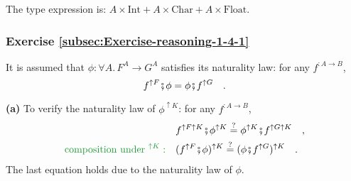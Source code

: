 The type expression is: $A\times\text{Int}+A\times\text{Char}+A\times\text{Float}$.


\subsubsection*{Exercise \ref{subsec:Exercise-reasoning-1-4-1}}

It is assumed that $\phi:\forall A.\,F^{A}\rightarrow G^{A}$ satisfies
its naturality law: for any $f^{:A\rightarrow B}$,
\[
f^{\uparrow F}\bef\phi=\phi\bef f^{\uparrow G}\quad.
\]

\textbf{(a)} To verify the naturality law of $\phi^{\uparrow K}$:
for any $f^{:A\rightarrow B}$,
\begin{align*}
 & f^{\uparrow F\uparrow K}\bef\phi^{\uparrow K}\overset{?}{=}\phi^{\uparrow K}\bef f^{\uparrow G\uparrow K}\quad,\\
{\color{greenunder}\text{composition under }^{\uparrow K}:}\quad & (f^{\uparrow F}\bef\phi)^{\uparrow K}\overset{?}{=}(\phi\bef f^{\uparrow G})^{\uparrow K}\quad.
\end{align*}
The last equation holds due to the naturality law of $\phi$.

